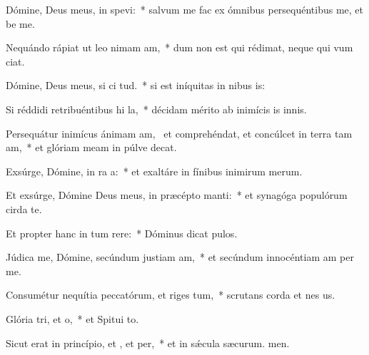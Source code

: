 \item Dómine, Deus meus, in  spevi:~* salvum me fac ex ómnibus persequéntibus me, et be me.
\item Nequándo rápiat ut leo nimam am,~* dum non est qui rédimat, neque qui vum ciat.
\item Dómine, Deus meus, si ci tud.~* si est iníquitas in nibus is:
\item Si réddidi retribuéntibus hi la,~* décidam mérito ab inimícis is innis.
\item Persequátur inimícus ánimam am,~\pscross{} et comprehéndat, et concúlcet in terra tam am,~* et glóriam meam in púlve decat.
\item Exsúrge, Dómine, in ra a:~* et exaltáre in fínibus inimirum merum.
\item Et exsúrge, Dómine Deus meus, in præcépto  manti:~* et synagóga populórum cirda te.
\item Et propter hanc in tum rere:~* Dóminus dicat pulos.
\item Júdica me, Dómine, secúndum justiam am,~* et secúndum innocéntiam am per me.
\item Consumétur nequítia peccatórum, et riges tum,~* scrutans corda et nes us.
\item Glória tri, et o,~* et Spitui to.
\item Sicut erat in princípio, et , et per,~* et in sǽcula sæcurum. men.
